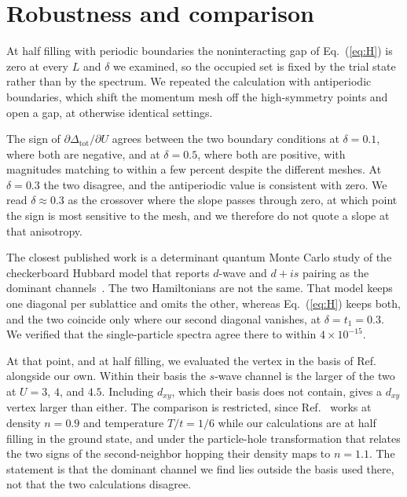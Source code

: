 \documentclass[aps,prb,reprint,superscriptaddress,amsmath,amssymb,floatfix]{revtex4-2}
\begin{document}
\section{Robustness and comparison}

At half filling with periodic boundaries the noninteracting gap of
Eq.~(\ref{eq:H}) is zero at every $L$ and $\delta$ we examined, so the occupied
set is fixed by the trial state rather than by the spectrum. We repeated the
calculation with antiperiodic boundaries, which shift the momentum mesh off the
high-symmetry points and open a gap, at otherwise identical settings.

The sign of $\partial \Delta_{\mathrm{tot}} / \partial U$ agrees between the two
boundary conditions at $\delta = 0.1$, where both are negative, and at
$\delta = 0.5$, where both are positive, with magnitudes matching to within a
few percent despite the different meshes. At $\delta = 0.3$ the two disagree,
and the antiperiodic value is consistent with zero. We read $\delta \approx 0.3$
as the crossover where the slope passes through zero, at which point the sign is
most sensitive to the mesh, and we therefore do not quote a slope at that
anisotropy.

The closest published work is a determinant quantum Monte Carlo study of the
checkerboard Hubbard model that reports $d$-wave and $d + is$ pairing as the
dominant channels~\cite{Pan2024}. The two Hamiltonians are not the same. That
model keeps one diagonal per sublattice and omits the other, whereas
Eq.~(\ref{eq:H}) keeps both, and the two coincide only where our second diagonal
vanishes, at $\delta = t_1 = 0.3$. We verified that the single-particle spectra
agree there to within $4\times10^{-15}$.

At that point, and at half filling, we evaluated the vertex in the basis of
Ref.~\cite{Pan2024} alongside our own. Within their basis the $s$-wave channel
is the larger of the two at $U = 3$, $4$, and $4.5$. Including $d_{xy}$, which
their basis does not contain, gives a $d_{xy}$ vertex larger than either.
The comparison is restricted, since Ref.~\cite{Pan2024} works at density
$n = 0.9$ and temperature $T/t = 1/6$ while our calculations are at half filling
in the ground state, and under the particle-hole transformation that relates the
two signs of the second-neighbor hopping their density maps to $n = 1.1$. The
statement is that the dominant channel we find lies outside the basis used
there, not that the two calculations disagree.
\end{document}
